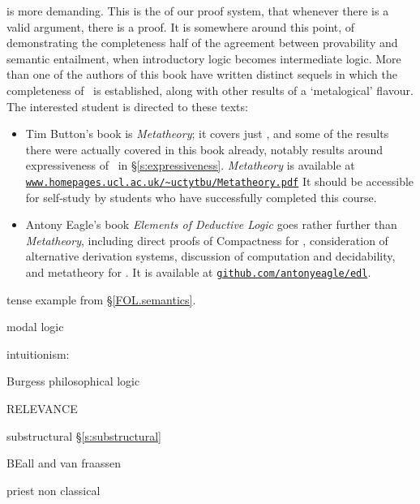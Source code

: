  is more demanding. This is the  of our proof system, that whenever there is a valid argument, there is a proof. It is somewhere around this point, of demonstrating the completeness half of the agreement between  provability and semantic entailment, when introductory logic becomes intermediate logic. More than one of the authors of this book have written distinct sequels in which the completeness of \TFL\ is established, along with other results of a `metalogical' flavour. The interested student is directed to these texts: \begin{itemize}
	\item Tim Button's book is \emph{Metatheory}; it covers just \TFL, and some of the results there were actually covered in this book already, notably results around expressiveness of \TFL\ in §\ref{s:expressiveness}. \emph{Metatheory} is available at \href{http://www.homepages.ucl.ac.uk/~uctytbu/Metatheory.pdf}{\nolinkurl{www.homepages.ucl.ac.uk/~uctytbu/Metatheory.pdf}} It should be accessible for self-study by students who have successfully completed this course.

\item Antony Eagle's book \emph{Elements of Deductive Logic} goes rather further than \emph{Metatheory}, including direct proofs of Compactness for \TFL, consideration of alternative derivation systems, discussion of computation and decidability, and metatheory for \FOL. It is available at \href{https://github.com/antonyeagle/edl}{\nolinkurl{github.com/antonyeagle/edl}}.
\end{itemize}

tense example from §\ref{FOL.semantics}.

modal logic

intuitionism: 

Burgess philosophical logic

RELEVANCE

substructural §\ref{s:substructural}

BEall and van fraassen

priest non classical


